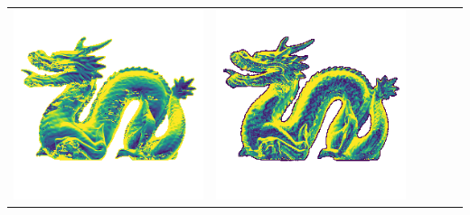 \begin{center}
\begin{tabularx}{\linewidth}{@{}Y@{}Y@{}Y@{}Y@{}Y@{}Y@{}}
\includegraphics[width=\linewidth]{semisynthetic/20150514_21_yu_err.png} &
\includegraphics[width=\linewidth]{semisynthetic/20150514_21_dpsn_err.png} &

\end{tabularx}
\end{center}
